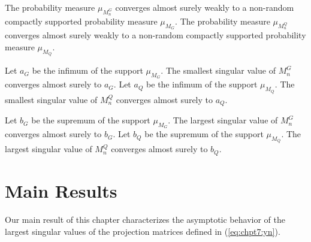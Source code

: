 \begin{Assum}\label{assum:m_limit}
The probability measure $\mu_{M_n^G}$ converges almost surely weakly to a non-random
compactly supported probability measure $\mu_{M_G}$. The probability measure $\mu_{M_n^Q}$
converges almost surely weakly to a non-random compactly supported probability measure
$\mu_{M_Q}$.  
\end{Assum}

\begin{Assum}
Let $a_G$ be the infimum of the support $\mu_{M_G}$. The smallest singular value of $M_n^G$
converges almost surely to $a_G$. Let $a_Q$ be the infimum of the support $\mu_{M_Q}$. The
smallest singular value of $M_n^Q$ converges almost surely to $a_Q$.
\end{Assum}

\begin{Assum}\label{assum:m_b}
Let $b_G$ be the supremum of the support $\mu_{M_G}$. The largest singular value of $M_n^G$
converges almost surely to $b_G$. Let $b_Q$ be the supremum of the support $\mu_{M_Q}$. The
largest singular value of $M_n^Q$ converges almost surely to $b_Q$.
\end{Assum}


\section{Main Results}\label{sec:chpt7:main_results}

Our main result of this chapter characterizes the asymptotic behavior of the largest
singular values of the projection matrices defined in (\ref{eq:chpt7:yn}).

